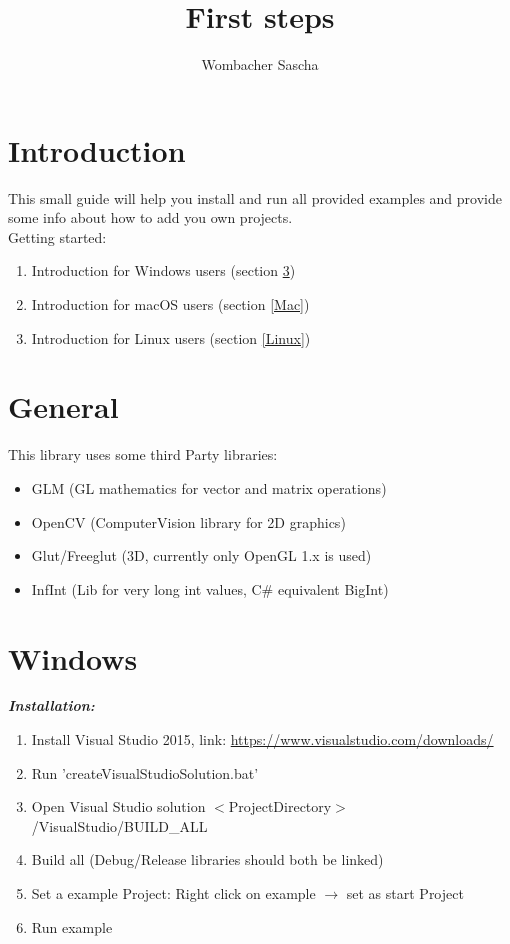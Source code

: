 \documentclass[]{article}
\title{First steps}
\author{Wombacher Sascha}
\begin{document}
\maketitle


\section{Introduction}

This small guide will help you install and run all provided examples and provide some info about how to add you own projects.\\

Getting started:
\begin{enumerate}
	\item Introduction for Windows users (section \ref{Windows})
	\item Introduction for \space macOS \space \space users (section \ref{Mac})
	\item Introduction for \space \space Linux \space \space \space users (section \ref{Linux})
\end{enumerate}


\section{General}
This library uses some third Party libraries:
\begin{itemize}
	\item GLM (GL mathematics for vector and matrix operations)
	\item OpenCV (ComputerVision library for 2D graphics)
	\item Glut/Freeglut (3D, currently only OpenGL 1.x is used)
	\item InfInt (Lib for very long int values, C\# equivalent BigInt)
\end{itemize}

\newpage
\section{Windows}\label{Windows}

\textit{\textbf{Installation:}}
\begin{enumerate}
	\item Install Visual Studio 2015, link: \url{https://www.visualstudio.com/downloads/}
	\item Run 'createVisualStudioSolution.bat'
	\item Open Visual Studio solution $<$ProjectDirectory$>$/VisualStudio/BUILD\_ALL
	\item Build all (Debug/Release libraries should both be linked)
	\item Set a example Project: Right click on example $\rightarrow$ set as start Project
	\item Run example \\
\end{enumerate}
\end{document}
